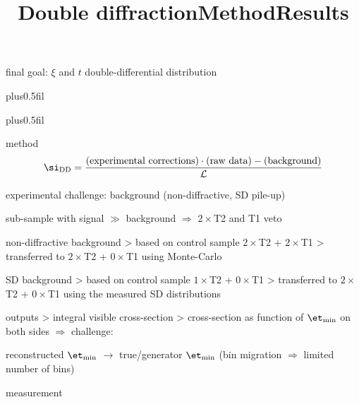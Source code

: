 \> final goal: $\xi$ and $t$ double-differential distribution

\newpage %
\hbox{}
\vfil
\title{Double diffraction}

\vskip0pt plus0.5fil

\vskip0pt plus0.5fil

\newpage %
\title{Method}

\vskip-3mm

\> method
$$\si_{\rm DD} = {\hbox{(experimental corrections)}\cdot\hbox{(raw data)} - \hbox{(background)}\over {\cal L}}$$

\> experimental challenge: background (non-diffractive, SD pile-up)


\centerline{\cYe sub-sample with signal $\gg$ background $\Rightarrow$  $2\times$T2 and T1 veto\cFg}


\> non-diffractive background
\>> based on control sample $2\times$T2 + $2\times$T1
\>> transferred to $2\times$T2 + $0\times$T1 using Monte-Carlo

\> SD background
\>> based on control sample $1\times$T2 + $0\times$T1
\>> transferred to $2\times$T2 + $0\times$T1 using the measured SD distributions


\> outputs
\>> integral visible cross-section
\>> cross-section as function of $\et_{\rm min}$ on both sides $\Rightarrow$ challenge:

\centerline{reconstructed $\et_{\rm min}$ $\longrightarrow$ true/generator $\et_{\rm min}$ \hskip5mm (bin migration $\Rightarrow$ limited number of bins)}


\newpage %
\title{Results}


\noindent{}

\> measurement

\centerline{}

